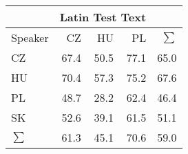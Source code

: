 \begin{tabular}{l|rrr|r}
\hline
 & \multicolumn{3}{c}{Latin Test Text} & \\
\hline
 Speaker   &   CZ &   HU &   PL &   $\sum$ \\
\hline
 CZ        & 67.4 & 50.5 & 77.1 &     65.0 \\
 HU        & 70.4 & 57.3 & 75.2 &     67.6 \\
 PL        & 48.7 & 28.2 & 62.4 &     46.4 \\
 SK        & 52.6 & 39.1 & 61.5 &     51.1 \\
\hline
 $\sum$   & 61.3 & 45.1 & 70.6 &     59.0 \\
\hline
\end{tabular}